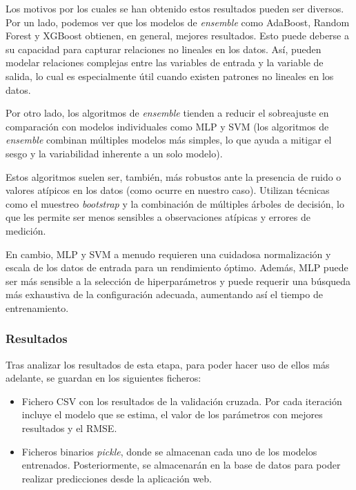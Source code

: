 
Los motivos por los cuales se han obtenido estos resultados pueden ser diversos. Por un lado, podemos ver que los modelos de \textit{ensemble} como AdaBoost, Random Forest y XGBoost obtienen, en general, mejores resultados. Esto puede deberse a su capacidad para capturar relaciones no lineales en los datos. Así, pueden modelar relaciones complejas entre las variables de entrada y la variable de salida, lo cual es especialmente útil cuando existen patrones no lineales en los datos. 

Por otro lado, los algoritmos de \textit{ensemble} tienden a reducir el sobreajuste en comparación con modelos individuales como MLP y SVM (los algoritmos de \textit{ensemble} combinan múltiples modelos más simples, lo que ayuda a mitigar el sesgo y la variabilidad inherente a un solo modelo).

Estos algoritmos suelen ser, también, más robustos ante la presencia de ruido o valores atípicos en los datos (como ocurre en nuestro caso). Utilizan técnicas como el muestreo \textit{bootstrap} y la combinación de múltiples árboles de decisión, lo que les permite ser menos sensibles a observaciones atípicas y errores de medición.

En cambio, MLP y SVM a menudo requieren una cuidadosa normalización y escala de los datos de entrada para un rendimiento óptimo. Además, MLP puede ser más sensible a la selección de hiperparámetros y puede requerir una búsqueda más exhaustiva de la configuración adecuada, aumentando así el tiempo de entrenamiento.

\subsubsection{Resultados}
Tras analizar los resultados de esta etapa, para poder hacer uso de ellos más adelante, se guardan en los siguientes ficheros:
\begin{itemize}
    \item Fichero CSV con los resultados de la validación cruzada. Por cada iteración incluye el modelo que se estima, el valor de los parámetros con mejores resultados y el RMSE.
    \item Ficheros binarios \textit{pickle}, donde se almacenan cada uno de los modelos entrenados. Posteriormente, se almacenarán en la base de datos para poder realizar predicciones desde la aplicación web.
\end{itemize}


